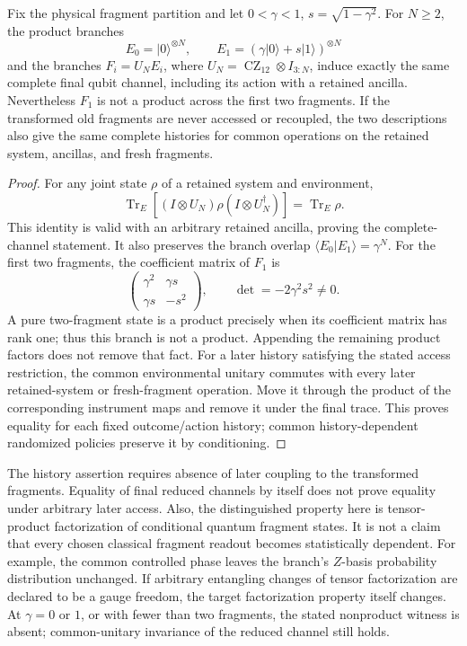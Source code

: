 \begin{theorem}
\label{op:environment}
Fix the physical fragment partition and let \(0<\gamma<1\),
\(s=\sqrt{1-\gamma^2}\).  For \(N\ge2\), the product branches
\[
 E_0=|0\rangle^{\otimes N},\qquad
 E_1=(\gamma|0\rangle+s|1\rangle)^{\otimes N}
\]
and the branches \(F_i=U_NE_i\), where
\(U_N=\operatorname{CZ}_{12}\otimes I_{3:\!N}\), induce exactly the
same complete final qubit channel, including its action with a retained
ancilla.  Nevertheless \(F_1\) is not a product across the first two
fragments.
If the transformed old fragments are never accessed or recoupled, the
two descriptions also give the same complete histories for common
operations on the retained system, ancillas, and fresh fragments.
\end{theorem}
\begin{proof}
For any joint state \(\rho\) of a retained system and environment,
\[
 \operatorname{Tr}_E[(I\otimes U_N)\rho(I\otimes U_N^\dagger)]
 =\operatorname{Tr}_E\rho .
\]
This identity is valid with an arbitrary retained ancilla, proving the
complete-channel statement.  It also preserves the branch overlap
\(\langle E_0|E_1\rangle=\gamma^N\).
For the first two fragments, the coefficient matrix of \(F_1\) is
\[
 \begin{pmatrix}\gamma^2&\gamma s\\
                 \gamma s&-s^2\end{pmatrix},
 \qquad \det=-2\gamma^2s^2\ne0 .
\]
A pure two-fragment state is a product precisely when its coefficient
matrix has rank one; thus this branch is not a product.
Appending the remaining product factors does not remove that fact.
For a later history satisfying the stated access restriction, the
common environmental unitary commutes with every later retained-system
or fresh-fragment operation.  Move it through the product of the
corresponding instrument maps and remove it under the final trace.
This proves equality for each fixed outcome/action history; common
history-dependent randomized policies preserve it by conditioning.
\end{proof}

The history assertion requires absence of later coupling to the
transformed fragments.  Equality of final reduced channels by itself
does not prove equality under arbitrary later access.  Also, the
distinguished property here is tensor-product factorization of
conditional quantum fragment states.  It is not a claim that every
chosen classical fragment readout becomes statistically dependent.
For example, the common controlled phase leaves the branch's
\(Z\)-basis probability distribution unchanged.  If arbitrary entangling
changes of tensor factorization are declared to be a gauge freedom,
the target factorization property itself changes.
At \(\gamma=0\) or \(1\), or with fewer than two fragments, the stated
nonproduct witness is absent; common-unitary invariance of the reduced
channel still holds.

